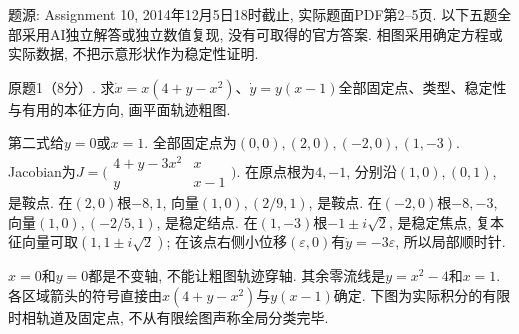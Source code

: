 题源: Assignment 10, 2014年12月5日18时截止, 实际题面PDF第2--5页. 以下五题全部采用AI独立解答或独立数值复现, 没有可取得的官方答案. 相图采用确定方程或实际数据, 不把示意形状作为稳定性证明.

\begin{exercise}
原题1（8分）. 求$\dot x=x(4+y-x^2)$、$\dot y=y(x-1)$全部固定点、类型、稳定性与有用的本征方向, 画平面轨迹粗图.
\end{exercise}
\begin{solution}
第二式给$y=0$或$x=1$. 全部固定点为$(0,0),(2,0),(-2,0),(1,-3)$. Jacobian为$J=\bigl(\begin{smallmatrix}4+y-3x^2&x\\y&x-1\end{smallmatrix}\bigr)$. 在原点根为$4,-1$, 分别沿$(1,0),(0,1)$, 是鞍点. 在$(2,0)$根$-8,1$, 向量$(1,0),(2/9,1)$, 是鞍点. 在$(-2,0)$根$-8,-3$, 向量$(1,0),(-2/5,1)$, 是稳定结点. 在$(1,-3)$根$-1\pm i\sqrt2$, 是稳定焦点, 复本征向量可取$(1,1\pm i\sqrt2)$; 在该点右侧小位移$(\varepsilon,0)$有$\dot y=-3\varepsilon$, 所以局部顺时针.

$x=0$和$y=0$都是不变轴, 不能让粗图轨迹穿轴. 其余零流线是$y=x^2-4$和$x=1$. 各区域箭头的符号直接由$x(4+y-x^2)$与$y(x-1)$确定. 下图为实际积分的有限时相轨道及固定点, 不从有限绘图声称全局分类完毕.
\end{solution}


